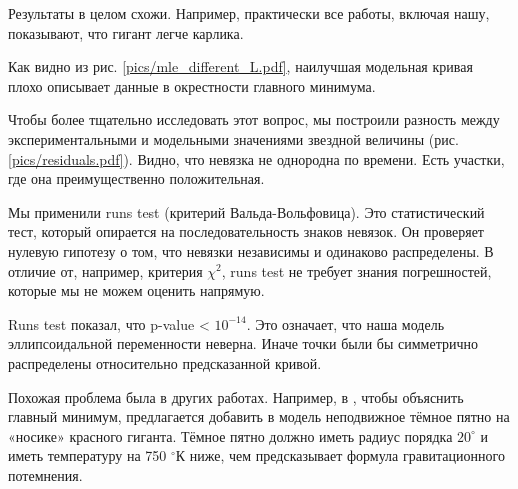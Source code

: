 
Результаты в целом схожи. Например, практически все работы, включая нашу, показывают, что гигант легче карлика.


\label{sect:RunsTest}

Как видно из рис. \ref{pics/mle_different_L.pdf}, наилучшая модельная кривая плохо описывает данные в окрестности главного минимума.

Чтобы более тщательно исследовать этот вопрос, мы построили разность между экспериментальными и модельными значениями звездной величины (рис. \ref{pics/residuals.pdf}). Видно, что невязка не однородна по времени. Есть участки, где она преимущественно положительная.


Мы применили runs test (критерий Вальда-Вольфовица). Это статистический тест, который опирается на последовательность знаков невязок. Он проверяет нулевую гипотезу о том, что невязки независимы и одинаково распределены. В отличие от, например, критерия $\chi^2$, runs test не требует знания погрешностей, которые мы не можем оценить напрямую.


Runs test показал, что p-value < $10^{-14}$. Это означает, что наша модель эллипсоидальной переменности неверна. Иначе точки были бы симметрично распределены относительно предсказанной кривой.

Похожая проблема была в других работах. Например, в \cite{Shanbaz}, чтобы объяснить главный минимум, предлагается добавить в модель неподвижное тёмное пятно на «носике» красного гиганта. Тёмное пятно должно иметь радиус порядка $20^\circ$ и иметь температуру на 750 ${}^\circ$К ниже, чем предсказывает формула гравитационного потемнения.



